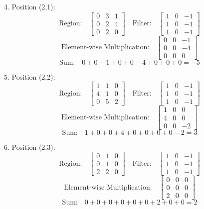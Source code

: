\documentclass{article}
\begin{document}
4. Position (2,1):
\[
  \text{Region:} \quad \begin{bmatrix} 0 & 3 & 1 \\ 0 & 2 & 4 \\ 0 & 2 & 0 \end{bmatrix} \quad \text{Filter:} \quad \begin{bmatrix} 1 & 0 & -1 \\ 1 & 0 & -1 \\ 1 & 0 & -1 \end{bmatrix}
\]
\[
  \text{Element-wise Multiplication:} \quad \begin{bmatrix} 0 & 0 & -1 \\ 0 & 0 & -4 \\ 0 & 0 & 0 \end{bmatrix}
\]
\[
  \text{Sum:} \quad 0 + 0 - 1 + 0 + 0 - 4 + 0 + 0 + 0 = -5
\]

5. Position (2,2):
\[
  \text{Region:} \quad \begin{bmatrix} 1 & 1 & 0 \\ 4 & 1 & 0 \\ 0 & 5 & 2 \end{bmatrix} \quad \text{Filter:} \quad \begin{bmatrix} 1 & 0 & -1 \\ 1 & 0 & -1 \\ 1 & 0 & -1 \end{bmatrix}
\]
\[
  \text{Element-wise Multiplication:} \quad \begin{bmatrix} 1 & 0 & 0 \\ 4 & 0 & 0 \\ 0 & 0 & -2 \end{bmatrix}
\]
\[
  \text{Sum:} \quad 1 + 0 + 0 + 4 + 0 + 0 + 0 + 0 - 2 = 3
\]

6. Position (2,3):
\[
  \text{Region:} \quad \begin{bmatrix} 0 & 1 & 0 \\ 0 & 1 & 0 \\ 2 & 2 & 0 \end{bmatrix} \quad \text{Filter:} \quad \begin{bmatrix} 1 & 0 & -1 \\ 1 & 0 & -1 \\ 1 & 0 & -1 \end{bmatrix}
\]
\[
  \text{Element-wise Multiplication:} \quad \begin{bmatrix} 0 & 0 & 0 \\ 0 & 0 & 0 \\ 2 & 0 & 0 \end{bmatrix}
\]
\[
  \text{Sum:} \quad 0 + 0 + 0 + 0 + 0 + 0 + 2 + 0 + 0 = 2
\]
\end{document}
